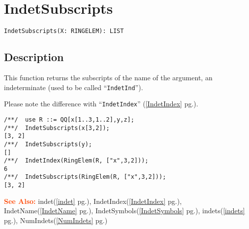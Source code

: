 \documentclass[a4paper]{mybook}
\newenvironment{command}{}{} %
\newcommand\SeeAlso{\par\textcolor{OrangeRed}{\textbf{\large See Also: }}}
\begin{document}
\section{IndetSubscripts}
\label{IndetSubscripts}
\begin{command} %


\begin{Verbatim}[label=syntax, rulecolor=\color{MidnightBlue},
frame=single]
IndetSubscripts(X: RINGELEM): LIST
\end{Verbatim}


\subsection*{Description}

This function returns the subscripts of the name of the argument,
an indeterminate (used to be called ``\verb&IndetInd&'').
\par 
Please note the difference with ``\verb&IndetIndex&'' (\ref{IndetIndex} pg.\pageref{IndetIndex}).
\begin{Verbatim}[label=example, rulecolor=\color{PineGreen}, frame=single]
/**/  use R ::= QQ[x[1..3,1..2],y,z];
/**/  IndetSubscripts(x[3,2]);
[3, 2]
/**/  IndetSubscripts(y);
[]
/**/  IndetIndex(RingElem(R, ["x",3,2]));
6
/**/  IndetSubscripts(RingElem(R, ["x",3,2]));
[3, 2]
\end{Verbatim}


\SeeAlso %
  indet(\ref{indet} pg.\pageref{indet}), 
    IndetIndex(\ref{IndetIndex} pg.\pageref{IndetIndex}), 
    IndetName(\ref{IndetName} pg.\pageref{IndetName}), 
    IndetSymbols(\ref{IndetSymbols} pg.\pageref{IndetSymbols}), 
    indets(\ref{indets} pg.\pageref{indets}), 
    NumIndets(\ref{NumIndets} pg.\pageref{NumIndets})
\end{command} %
\end{document}

